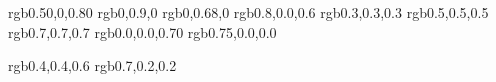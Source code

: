 

\usepackage{color}
\usepackage{xcolor}
\definecolor{purple}   {rgb}{0.50,0,0.80}    %
\definecolor{lime}     {rgb}{0,0.9,0}        %
\definecolor{green}    {rgb}{0,0.68,0}       %
\definecolor{magenta}  {rgb}{0.8,0.0,0.6}    %
\definecolor{dgrey}     {rgb}{0.3,0.3,0.3}    %
\definecolor{grey}     {rgb}{0.5,0.5,0.5}    %
\definecolor{lgrey}    {rgb}{0.7,0.7,0.7}    %
\definecolor{darkblue} {rgb}{0.0,0.0,0.70}   %
\definecolor{darkred}  {rgb}{0.75,0.0,0.0}   %



\definecolor{oldcolor}   {rgb}{0.4,0.4,0.6}  %
\definecolor{usedcolor}  {rgb}{0.7,0.2,0.2}  %
